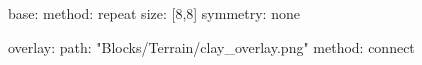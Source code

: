 base:
  method: repeat
  size: [8,8]
  symmetry: none

overlay:
  path: "Blocks/Terrain/clay_overlay.png"
  method: connect
